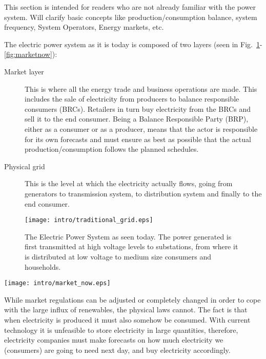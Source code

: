 This section is intended for readers who are not already familiar with the power system. Will clarify basic concepts like production/consumption balance, system frequency, System Operators, Energy markets, etc.

The electric power system as it is today is composed of two layers (seen in Fig.~\ref{fig:powernow}-\ref{fig:marketnow}): 
\begin{description}
	\item[Market layer] This is where all the energy trade and business operations are made. This includes the sale of electricity from producers to balance responsible consumers (BRCs). Retailers in turn buy electricity from the BRCs and sell it to the end consumer. Being a Balance Responsible Party (BRP), either as a consumer or as a producer, means that the actor is responsible for its own forecasts and must ensure as best as possible that the actual production/consumption follows the planned schedules.
	\item[Physical grid] This is the level at which the electricity actually flows, going from generators to transmission system, to distribution system and finally to the end consumer.
\end{description}

\begin{figure}
	\centering
	\texttt{[image: intro/traditional\_grid.eps]}
	\caption{The Electric Power System as seen today. The power generated is first transmitted at high voltage levels to substations, from where it is distributed at low voltage to medium size consumers and households.}\label{fig:powernow}
\end{figure}
\begin{figure*}
	\centering
	\texttt{[image: intro/market\_now.eps]}
	\caption{The actors and relationships in the power market today. Note that the consumer buys electricity from a retailer, but has no further contact to the other market actors.}\label{fig:marketnow}
\end{figure*}


While market regulations can be adjusted or completely changed in order to cope with the large influx of renewables, the physical laws cannot.
The fact is that when electricity is produced it must also somehow be consumed. With current technology it is unfeasible to store electricity in large quantities, therefore, electricity companies must make forecasts on how much electricity we (consumers) are going to need next day, and buy electricity accordingly. 

